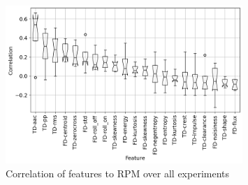 \begin{figure}[h]
    \centering
    \includegraphics[width=0.8\textwidth]{assets/results/feature-values/corr-to-rpm.png}
    \caption{Correlation of features to RPM over all experiments}
\end{figure}

